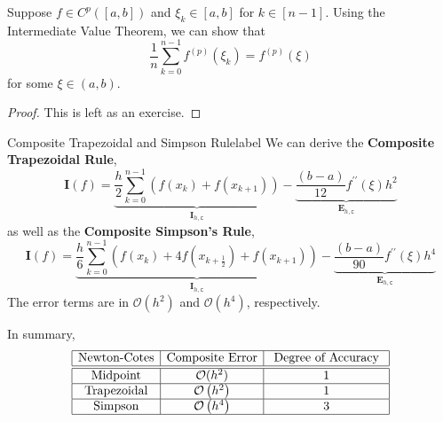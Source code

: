 \begin{prop}
	Suppose $f \in C^{p}([a, b])$ and $\xi_k \in [a, b]$ for $k \in [n-1]$. Using the Intermediate Value Theorem, we can show that
	\[\frac{1}{n} \sum_{k=0}^{n-1} f^{(p)}\left(\xi_k\right)=f^{(p)}(\xi)\]
	for some $\xi \in (a, b)$.
\end{prop}

\begin{proof}
	This is left as an exercise.
\end{proof}

\begin{ex}{Composite Trapezoidal and Simpson Rule}{label}
	We can derive the \textbf{Composite Trapezoidal Rule},
	\[\mathbf{I}(f)=\underbrace{\frac{h}{2} \sum_{k=0}^{n-1}\left(f\left(x_k\right)+f\left(x_{k+1}\right)\right)}_{\mathbf{I}_{h, \texttt{c}}}-\underbrace{\frac{(b-a)}{12} f^{\prime \prime}(\xi) h^2}_{\mathbf{E}_{h, \texttt{c}}}\]
	as well as the \textbf{Composite Simpson's Rule},
	\[\mathbf{I}(f)=\underbrace{\frac{h}{6} \sum_{k=0}^{n-1}\left(f\left(x_k\right)+4 f\left(x_{k+\frac{1}{2}}\right)+f\left(x_{k+1}\right)\right)}_{\mathbf{I}_{h, \texttt{c}}}-\underbrace{\frac{(b-a)}{90} f^{\prime \prime}(\xi) h^4}_{\mathbf{E}_{h, \texttt{c}}}\]
	The error terms are in $\mathcal{O}\left(h^2\right)$ and $\mathcal{O}\left(h^4\right)$, respectively.
\end{ex}

\noindent In summary,
\[\begin{array}{|c|c|c|}
\hline \text {Newton-Cotes} & \text {Composite Error} & \text { Degree of Accuracy } \\
\hline \hline \text {Midpoint} & \mathcal{O}(h^2) & 1 \\
\hline \text {Trapezoidal} & \mathcal{O}\left(h^2\right) & 1\\
\hline \text {Simpson} & \mathcal{O}\left(h^4\right) & 3 \\
\hline
\end{array}\]